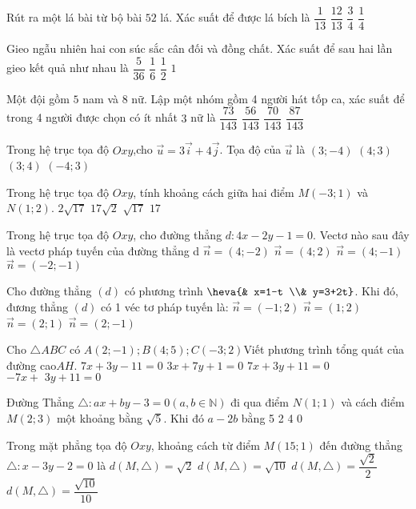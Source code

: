 \begin{ex}
Rút ra một lá bài từ bộ bài $52$ lá. Xác suất để được lá bích là
\choice
{$\dfrac{1}{13}$}
{$\dfrac{12}{13}$}
{$\dfrac{3}{4}$}
{$\dfrac{1}{4}$}
\end{ex}
\begin{ex}
Gieo ngẫu nhiên hai con súc sắc cân đối và đồng chất. Xác suất để sau hai lần gieo kết quả như nhau là
\choice
{$\dfrac{5}{36}$}
{$\dfrac{1}{6}$}
{$\dfrac{1}{2}$}
{$1$}
\end{ex}
\begin{ex}
Một đội gồm $5$ nam và $8$ nữ. Lập một nhóm gồm 4 người hát tốp ca, xác suất để trong 4 người được chọn có ít nhất $3$ nữ là
\choice
{$\dfrac{73}{143}$}
{$\dfrac{56}{143}$}
{$\dfrac{70}{143}$}
{$\dfrac{87}{143}$}
\end{ex}
\begin{ex}
Trong hệ trục tọa độ $Oxy$,cho $\vec{u}=3\vec{i}+4\vec{j}$. Tọa độ của $\vec{u}$ là
\choice
{$(3;-4)$}
{$(4;3)$}
{$(3;4)$}
{$(-4;3)$}
\end{ex}
\begin{ex}
Trong hệ trục tọa độ $Oxy$, tính khoảng cách giữa hai điểm $M(-3;1)$ và $N(1;2)$.
\choice
{$2\sqrt{17}$}
{$17\sqrt{2}$}
{$\sqrt{17}$}
{$17$}
\end{ex}
\begin{ex}
Trong hệ trục tọa độ $Oxy$, cho đường thẳng $d\colon 4x-2y-1=0$. Vectơ nào sau đây là vectơ pháp tuyến của đường thẳng d
\choice
{$\vec{n}=(4;-2)$}
{$\vec{n}=(4;2)$}
{$\vec{n}=(4;-1)$}
{$\vec{n}=(-2;-1)$}
\end{ex}
\begin{ex}
Cho đường thẳng $(d)$ có phương trình $\heva{& x=1-t \\& y=3+2t} $. Khi đó, đương thẳng $(d)$ có 1 véc tơ pháp tuyến là:
\choice
{$\vec{n}=(-1;2)$}
{$\vec{n}=(1;2)$}
{$\vec{n}=(2;1)$}
{$\vec{n}=(2;-1)$}
\end{ex}
\begin{ex}
Cho $\triangle ABC$ có $A(2;-1); B(4;5); C(-3;2)$Viết phương trình tổng quát của đường cao$AH$.
\choice
{$7x + 3y-11 = 0$}
{$3x + 7y + 1 = 0$}
{$7x + 3y +11 = 0$}
{$-7x +\text{ 3}y + 11 = 0$}
\end{ex}
\begin{ex}
Đường Thẳng $\triangle \colon ax+by-3=0(a,b\in \mathbb{N})$ đi qua điểm $N(1;1)$ và cách điểm $M(2;3)$ một khoảng bằng $\sqrt{5}$. Khi đó $a-2b$ bằng
\choice
{5}
{2}
{4}
{0}
\end{ex}
\begin{ex}
Trong mặt phẳng tọa độ $Oxy$, khoảng cách từ điểm $M(15;1)$ đến đường thẳng $\triangle \colon x-3y-2=0$ là
\choice
{$d\left(M,\triangle\right)=\sqrt{2}$}
{$d\left(M,\triangle\right)=\sqrt{10}$}
{$d\left(M,\triangle\right)=\dfrac{\sqrt{2}}{2}$}
{$d\left(M,\triangle\right)=\dfrac{\sqrt{10}}{10}$}
\end{ex}
